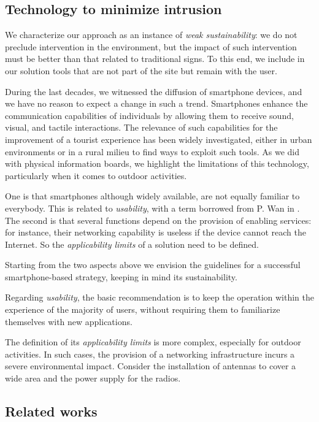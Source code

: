 \documentclass[sustainability,article,submit,pdftex,moreauthors]{Definitions/mdpi}
\begin{document}
\subsection{Technology to minimize intrusion \label{sec:minimize}}

We characterize our approach as an instance of {\em weak sustainability}: we do not preclude intervention in the environment, but the impact of such intervention must be better than that related to traditional signs. To this end, we include in our solution tools that are not part of the site but remain with the user.   

During the last decades, we witnessed the diffusion of smartphone devices, and we have no reason to expect a change in such a trend. Smartphones enhance the communication capabilities of individuals by allowing them to receive sound, visual, and tactile interactions. The relevance of such capabilities for the improvement of a tourist experience has been widely investigated, either in urban environments \cite{liu16a} or in a rural milieu \cite{kum20a} to find ways to exploit such tools. As we did with physical information boards, we highlight the limitations of this technology, particularly when it comes to outdoor activities.

One is that smartphones although widely available, are not equally familiar to everybody. This is related to {\em usability}, with a term borrowed from P. Wan in \cite{wan22a}. The second is that several functions depend on the provision of enabling services: for instance, their networking capability is useless if the device cannot reach the Internet. So the {\em applicability limits} of a solution need to be defined.

Starting from the two aspects above we envision the guidelines for a successful smartphone-based strategy, keeping in mind its sustainability.

Regarding \textit{usability}, the basic recommendation is to keep the operation within the experience of the majority of users, without requiring them to familiarize themselves with new applications.

The definition of its {\em applicability limits} is more complex, especially for outdoor activities. In such cases, the provision of a networking infrastructure incurs a severe environmental impact. Consider the installation of antennas to cover a wide area and the power supply for the radios. 


\subsection{Related works}
\end{document}
